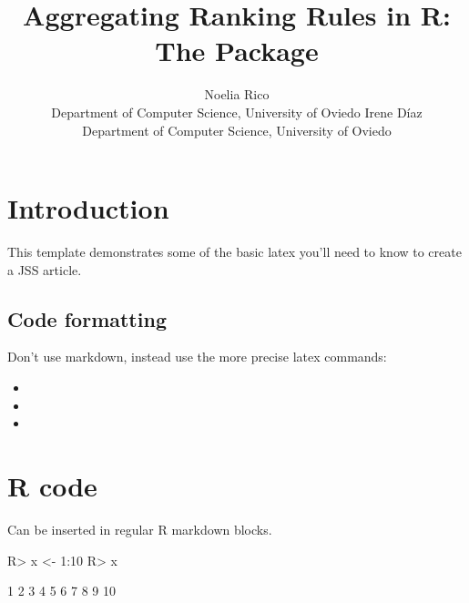 \documentclass[
]{jss}
\author{
Noelia Rico\\Department of Computer Science, University of Oviedo \And Irene Díaz\\Department of Computer Science, University of Oviedo
}
\title{Aggregating Ranking Rules in R: The Package \pkg{consensus}}
\begin{document}
\hypertarget{introduction}{%
\section{Introduction}\label{introduction}}

This template demonstrates some of the basic latex you'll need to know
to create a JSS article.

\hypertarget{code-formatting}{%
\subsection{Code formatting}\label{code-formatting}}

Don't use markdown, instead use the more precise latex commands:

\begin{itemize}
\item
\item
\item
\end{itemize}

\hypertarget{r-code}{%
\section{R code}\label{r-code}}

Can be inserted in regular R markdown blocks.

\begin{CodeChunk}

\begin{CodeInput}
R> x <- 1:10
R> x
\end{CodeInput}

\begin{CodeOutput}
 [1]  1  2  3  4  5  6  7  8  9 10
\end{CodeOutput}
\end{CodeChunk}
\end{document}
